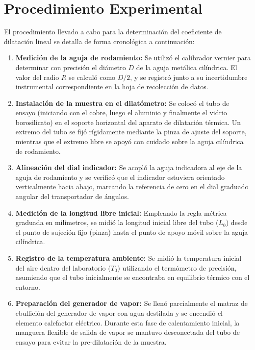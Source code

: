 
\section{Procedimiento Experimental}

El procedimiento llevado a cabo para la determinación del coeficiente de dilatación lineal se detalla de forma cronológica a continuación:

\begin{enumerate}
    \item \textbf{Medición de la aguja de rodamiento:} Se utilizó el calibrador vernier para determinar con precisión el diámetro $D$ de la aguja metálica cilíndrica. El valor del radio $R$ se calculó como $D/2$, y se registró junto a su incertidumbre instrumental correspondiente en la hoja de recolección de datos.
    \item \textbf{Instalación de la muestra en el dilatómetro:} Se colocó el tubo de ensayo (iniciando con el cobre, luego el aluminio y finalmente el vidrio borosilicato) en el soporte horizontal del aparato de dilatación térmica. Un extremo del tubo se fijó rígidamente mediante la pinza de ajuste del soporte, mientras que el extremo libre se apoyó con cuidado sobre la aguja cilíndrica de rodamiento.
    \item \textbf{Alineación del dial indicador:} Se acopló la aguja indicadora al eje de la aguja de rodamiento y se verificó que el indicador estuviera orientado verticalmente hacia abajo, marcando la referencia de cero en el dial graduado angular del transportador de ángulos.
    \item \textbf{Medición de la longitud libre inicial:} Empleando la regla métrica graduada en milímetros, se midió la longitud inicial libre del tubo ($L_0$) desde el punto de sujeción fijo (pinza) hasta el punto de apoyo móvil sobre la aguja cilíndrica.
    \item \textbf{Registro de la temperatura ambiente:} Se midió la temperatura inicial del aire dentro del laboratorio ($T_0$) utilizando el termómetro de precisión, asumiendo que el tubo inicialmente se encontraba en equilibrio térmico con el entorno.
    \item \textbf{Preparación del generador de vapor:} Se llenó parcialmente el matraz de ebullición del generador de vapor con agua destilada y se encendió el elemento calefactor eléctrico. Durante esta fase de calentamiento inicial, la manguera flexible de salida de vapor se mantuvo desconectada del tubo de ensayo para evitar la pre-dilatación de la muestra.

\end{enumerate}
